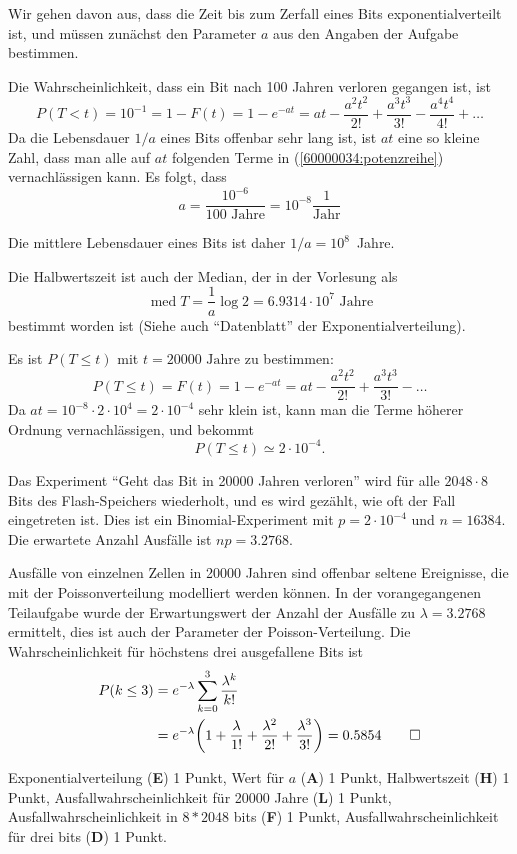 \begin{loesung}
Wir gehen davon aus, dass die Zeit bis zum Zerfall eines Bits 
exponentialverteilt ist, und müssen zunächst den Parameter $a$
aus den Angaben der Aufgabe bestimmen.

Die Wahrscheinlichkeit, dass ein Bit nach 100 Jahren verloren gegangen
ist, ist
\begin{equation}
P(T < t) = 10^{-1}=
1-F(t)=1-e^{-at}
=at-\frac{a^2t^2}{2!}+\frac{a^3t^3}{3!}-\frac{a^4t^4}{4!}+\dots
\label{60000034:potenzreihe}
\end{equation}
Da die Lebensdauer $1/a$ eines Bits offenbar sehr lang ist, ist $at$
eine so kleine Zahl, dass man alle auf $at$ folgenden Terme
in (\ref{60000034:potenzreihe}) vernachlässigen kann. Es folgt, dass
\[
a=\frac{10^{-6}}{100\text{ Jahre}}=10^{-8}\frac{1}{\text{Jahr}}
\]
\begin{teilaufgaben}
\item
Die mittlere Lebensdauer eines Bits ist daher $1/a=10^8$~Jahre.
\item
Die Halbwertszeit ist auch der Median, der in der Vorlesung als
\[
\operatorname{med} T=\frac1a\log 2=6.9314\cdot10^{7} \text{ Jahre}
\]
bestimmt worden ist (Siehe auch ``Datenblatt'' der Exponentialverteilung).
\item
Es ist $P(T\le t)$ mit $t=20000\text{ Jahre}$ zu bestimmen:
\[
P(T\le t)
=
F(t)
=
1-e^{-at}
=
at-\frac{a^2t^2}{2!}+\frac{a^3t^3}{3!}-\dots
\]
Da $at=10^{-8}\cdot 2\cdot 10^4=2\cdot 10^{-4}$ sehr klein ist, kann man die 
Terme höherer Ordnung vernachlässigen, und bekommt
\[
P(T\le t) \simeq 2\cdot 10^{-4}.
\]
\item 
Das Experiment ``Geht das Bit in 20000 Jahren verloren'' wird
für alle $2048\cdot 8$ Bits des Flash-Speichers wiederholt, und es
wird gezählt, wie oft der Fall eingetreten ist.
Dies ist ein Binomial-Experiment mit $p=2\cdot 10^{-4}$ und $n=16384$.
Die erwartete Anzahl Ausfälle ist $np=3.2768$.
\item
Ausfälle von einzelnen Zellen in 20000 Jahren sind offenbar seltene Ereignisse,
die mit der Poissonverteilung modelliert werden können.
In der vorangegangenen Teilaufgabe wurde der Erwartungswert der Anzahl
der Ausfälle zu $\lambda = 3.2768$ ermittelt, dies ist auch der Parameter
der Poisson-Verteilung.
Die Wahrscheinlichkeit für höchstens drei ausgefallene Bits ist
\begin{align*}
P(k\le 3)&=e^{-\lambda}\sum_{k=0}^3\frac{\lambda^k}{k!}
\\
&=e^{-\lambda}\biggl(
1+\frac{\lambda}{1!}
+
\frac{\lambda^2}{2!}
+
\frac{\lambda^3}{3!}
\biggr)
=0.5854
\qedhere
\end{align*}
\end{teilaufgaben}
\end{loesung}

\begin{bewertung}
Exponentialverteilung ({\bf E}) 1 Punkt,
Wert für $a$ ({\bf A}) 1 Punkt,
Halbwertszeit ({\bf H}) 1 Punkt,
Ausfallwahrscheinlichkeit für 20000 Jahre ({\bf L}) 1 Punkt,
Ausfallwahrscheinlichkeit in $8*2048$ bits ({\bf F}) 1 Punkt,
Ausfallwahrscheinlichkeit für drei bits ({\bf D}) 1 Punkt.
\end{bewertung}

